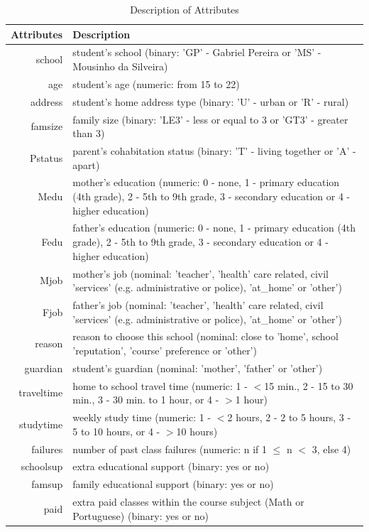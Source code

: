 \documentclass[conference]{IEEEtran}
\begin{document}
\begin{table}[!t]
\renewcommand{\arraystretch}{1.3}
\caption{Description of Attributes}
\label{table:attr-descr}
\centering
\begin{tabular}{|r || l|}
\hline
\bfseries Attributes & \bfseries Description \\
\hline\hline
school & student's school (binary: 'GP' - Gabriel Pereira or 'MS' - Mousinho da Silveira)\\
age & student's age (numeric: from 15 to 22)\\
address & student's home address type (binary: 'U' - urban or 'R' - rural)\\
famsize & family size (binary: 'LE3' - less or equal to 3 or 'GT3' - greater than 3)\\
Pstatus & parent's cohabitation status (binary: 'T' - living together or 'A' - apart)\\
Medu & mother's education (numeric: 0 - none, 1 - primary education (4th grade), 2 - 5th to 9th grade, 3 - secondary education or 4 - higher education)\\
Fedu & father's education (numeric: 0 - none, 1 - primary education (4th grade), 2 - 5th to 9th grade, 3 - secondary education or 4 - higher education)\\
Mjob & mother's job (nominal: 'teacher', 'health' care related, civil 'services' (e.g. administrative or police), 'at\_home' or 'other')\\
Fjob & father's job (nominal: 'teacher', 'health' care related, civil 'services' (e.g. administrative or police), 'at\_home' or 'other')\\
reason & reason to choose this school (nominal: close to 'home', school 'reputation', 'course' preference or 'other')\\
guardian & student's guardian (nominal: 'mother', 'father' or 'other')\\
traveltime & home to school travel time (numeric: 1 - $<$15 min., 2 - 15 to 30 min., 3 - 30 min. to 1 hour, or 4 - $>$1 hour)\\
studytime & weekly study time (numeric: 1 - $<$2 hours, 2 - 2 to 5 hours, 3 - 5 to 10 hours, or 4 - $>$10 hours)\\
failures & number of past class failures (numeric: n if 1 $\leq$ n $<$ 3, else 4)\\
schoolsup & extra educational support (binary: yes or no)\\
famsup & family educational support (binary: yes or no)\\
paid & extra paid classes within the course subject (Math or Portuguese) (binary: yes or no)\\

\end{tabular}
\end{table}
\end{document}
